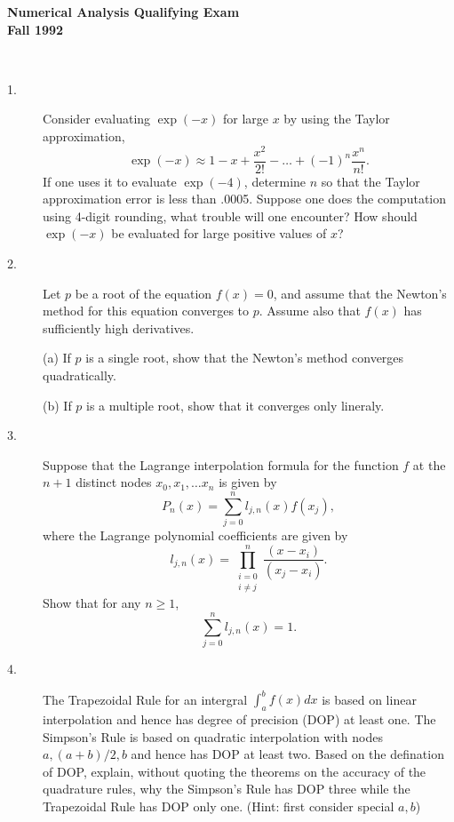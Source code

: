 \documentclass{article}
\begin{document}






\begin{center}\begin{LARGE}
{\bf Numerical Analysis Qualifying Exam}\\ 
{\bf Fall 1992}\\ \end{LARGE}
\end{center}
\vspace{0.1in}
\noindent\hrulefill\\

\begin{description}
\item[1.]
Consider evaluating $\exp(-x)$ for large $x$ by using the Taylor
approximation,
$$\exp (-x) \approx 1-x + \frac{x^2}{2!} - \dots + (-1)^n
  \frac{x^n}{n!}.$$
If one uses it to evaluate $\exp(-4)$, determine $n$ so that the Taylor
approximation error is less than .0005. Suppose one does the computation
using 4-digit rounding, what trouble will one encounter? How should
$\exp(-x)$ be evaluated for large positive values of $x$?

\item[2.]
Let $p$ be a root of the equation $f(x) = 0$, and assume that the Newton's
method for this equation converges to $p$. Assume also that $f(x)$ has
sufficiently high derivatives.

\item[\quad] (a)
If $p$ is a single root, show that the Newton's method converges
quadratically.

\item[\quad] (b)
If $p$ is a multiple root, show that it converges only lineraly.

\item[3.]
Suppose that the Lagrange interpolation formula for the function $f$ at
the $n+1$ distinct nodes $x_0, x_1, \dots x_n$ is given by
$$P_n(x) = \sum^n_{j=0} l_{j,n} (x) f(x_j),$$
where the Lagrange polynomial coefficients are given by
$$l_{j,n} (x) = \prod^n_{\substack {i =0 \\ i \neq j}}
  \frac{(x-x_i)}{(x_j - x_i)}.$$
Show that for any $n \geq 1$,
$$\sum^n_{j=0} l_{j,n} (x) = 1.$$

\item[4.]
The Trapezoidal Rule for an intergral $\int^b_a f(x)dx$ is based on linear
interpolation and hence has degree of precision (DOP) at least one. The
Simpson's Rule is based on quadratic interpolation with nodes $a, (a+b)/2, b$
and hence has DOP at least two. Based on the defination of DOP, explain,
without quoting the theorems on the accuracy of the quadrature rules, why
the Simpson's Rule has DOP three while the Trapezoidal Rule has DOP only one.
(Hint: first consider special $a,b$)


\end{description}
\end{document}
